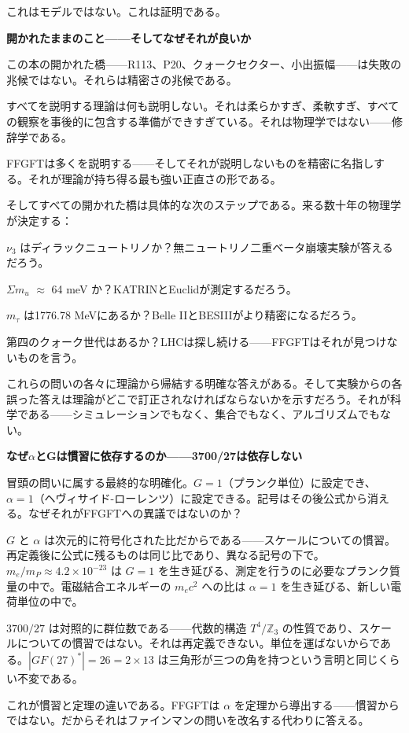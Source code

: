 \documentclass[11pt,openany]{book}
\begin{document}
これはモデルではない。これは証明である。

\textbf{開かれたままのこと——そしてなぜそれが良いか}

この本の開かれた橋——R113、P20、クォークセクター、小出振幅——は失敗の兆候ではない。それらは精密さの兆候である。

すべてを説明する理論は何も説明しない。それは柔らかすぎ、柔軟すぎ、すべての観察を事後的に包含する準備ができすぎている。それは物理学ではない——修辞学である。

FFGFTは多くを説明する——そしてそれが説明しないものを精密に名指しする。それが理論が持ち得る最も強い正直さの形である。

そしてすべての開かれた橋は具体的な次のステップである。来る数十年の物理学が決定する：

$\nu_3$ はディラックニュートリノか？無ニュートリノ二重ベータ崩壊実験が答えるだろう。

$\Sigma m_
u$ $\approx$ 64 meV か？KATRINとEuclidが測定するだろう。

$m_\tau$ は1776.78 MeVにあるか？Belle IIとBESIIIがより精密になるだろう。

第四のクォーク世代はあるか？LHCは探し続ける——FFGFTはそれが見つけないものを言う。

これらの問いの各々に理論から帰結する明確な答えがある。そして実験からの各誤った答えは理論がどこで訂正されなければならないかを示すだろう。それが科学である——シミュレーションでもなく、集合でもなく、アルゴリズムでもない。

\textbf{なぜ$\alpha$とGは慣習に依存するのか——3700/27は依存しない}

冒頭の問いに属する最終的な明確化。$G=1$（プランク単位）に設定でき、$\alpha=1$（ヘヴィサイド-ローレンツ）に設定できる。記号はその後公式から消える。なぜそれがFFGFTへの異議ではないのか？

$G$ と $\alpha$ は次元的に符号化された比だからである——スケールについての慣習。再定義後に公式に残るものは同じ比であり、異なる記号の下で。$m_e/m_P \approx 4.2\times10^{-23}$ は $G=1$ を生き延びる、測定を行うのに必要なプランク質量の中で。電磁結合エネルギーの $m_e c^2$ への比は $\alpha=1$ を生き延びる、新しい電荷単位の中で。

$3700/27$ は対照的に群位数である——代数的構造 $T^4/\mathbb{Z}_3$ の性質であり、スケールについての慣習ではない。それは再定義できない。単位を運ばないからである。$|GF(27)^*| = 26 = 2\times13$ は三角形が三つの角を持つという言明と同じくらい不変である。

これが慣習と定理の違いである。FFGFTは $\alpha$ を定理から導出する——慣習からではない。だからそれはファインマンの問いを改名する代わりに答える。
\end{document}
